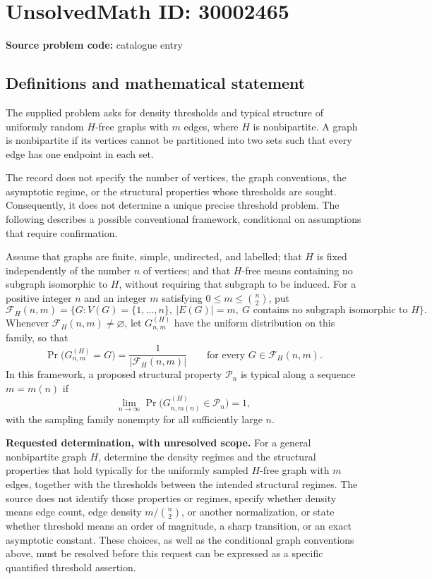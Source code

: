\documentclass[11pt]{article}
\begin{document}
\section*{UnsolvedMath ID: 30002465}
\textbf{Source problem code:} catalogue entry
\subsection{Definitions and mathematical statement}
The supplied problem asks for density thresholds and typical structure of uniformly random \(H\)-free graphs with \(m\) edges, where \(H\) is nonbipartite. A graph is nonbipartite if its vertices cannot be partitioned into two sets such that every edge has one endpoint in each set.

The record does not specify the number of vertices, the graph conventions, the asymptotic regime, or the structural properties whose thresholds are sought. Consequently, it does not determine a unique precise threshold problem. The following describes a possible conventional framework, conditional on assumptions that require confirmation.

Assume that graphs are finite, simple, undirected, and labelled; that \(H\) is fixed independently of the number \(n\) of vertices; and that \(H\)-free means containing no subgraph isomorphic to \(H\), without requiring that subgraph to be induced. For a positive integer \(n\) and an integer \(m\) satisfying \(0\le m\le\binom{n}{2}\), put
\[
\mathcal F_H(n,m)=\bigl\{G:V(G)=\{1,\ldots,n\},\ |E(G)|=m,\ G\text{ contains no subgraph isomorphic to }H\bigr\}.
\]
Whenever \(\mathcal F_H(n,m)\ne\varnothing\), let \(G_{n,m}^{(H)}\) have the uniform distribution on this family, so that
\[
\Pr\bigl(G_{n,m}^{(H)}=G\bigr)=\frac{1}{|\mathcal F_H(n,m)|}
\qquad\text{for every }G\in\mathcal F_H(n,m).
\]
In this framework, a proposed structural property \(\mathcal P_n\) is typical along a sequence \(m=m(n)\) if
\[
\lim_{n\to\infty}\Pr\bigl(G_{n,m(n)}^{(H)}\in\mathcal P_n\bigr)=1,
\]
with the sampling family nonempty for all sufficiently large \(n\).

\textbf{Requested determination, with unresolved scope.} For a general nonbipartite graph \(H\), determine the density regimes and the structural properties that hold typically for the uniformly sampled \(H\)-free graph with \(m\) edges, together with the thresholds between the intended structural regimes. The source does not identify those properties or regimes, specify whether density means edge count, edge density \(m/\binom{n}{2}\), or another normalization, or state whether threshold means an order of magnitude, a sharp transition, or an exact asymptotic constant. These choices, as well as the conditional graph conventions above, must be resolved before this request can be expressed as a specific quantified threshold assertion.
\end{document}
